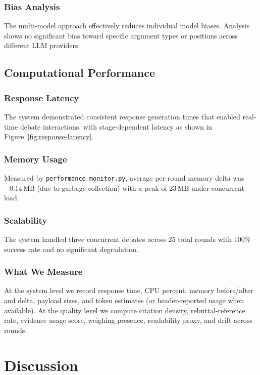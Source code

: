 \documentclass{article}
\begin{document}
\subsubsection{Bias Analysis}
The multi-model approach effectively reduces individual model biases. Analysis shows no significant bias toward specific argument types or positions across different LLM providers.

\subsection{Computational Performance}

\subsubsection{Response Latency}
The system demonstrated consistent response generation times that enabled real-time debate interactions, with stage-dependent latency as shown in Figure~\ref{fig:response-latency}.

\subsubsection{Memory Usage}
Measured by \texttt{performance\_monitor.py}, average per-round memory delta was \(-0.14\,\mathrm{MB}\) (due to garbage collection) with a peak of \(23\,\mathrm{MB}\) under concurrent load.

\subsubsection{Scalability}
The system handled three concurrent debates across 25 total rounds with 100\% success rate and no significant degradation.

\subsubsection{What We Measure}
At the system level we record response time, CPU percent, memory before/after and delta, payload sizes, and token estimates (or header-reported usage when available). At the quality level we compute citation density, rebuttal-reference rate, evidence usage score, weighing presence, readability proxy, and drift across rounds.

\section{Discussion}
\end{document}
